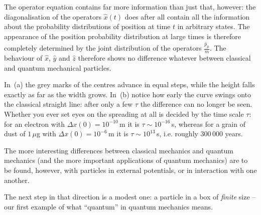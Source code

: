 The operator equation contains far more information than just that, however: the diagonalisation of the operators $\widehat{x}(t)$ does after all contain all the information about the probability distributions of position at time $t$ in arbitrary states. The appearance of the position probability distribution at large times is therefore completely determined by the joint distribution of the operators $\frac{\widehat{p}_\mu}{m}$. The behaviour of $\widehat{x}$, $\widehat{y}$ and $\widehat{z}$ therefore shows no difference whatever between classical and quantum mechanical particles.



In~(a) the grey marks of the centres advance in equal steps, while
the height falls exactly as far as the width grows. In~(b) notice
how early the curve swings onto the classical straight line: after only a few
$\tau$ the difference can no longer be seen. Whether you ever set eyes
on the spreading at all is decided by the time scale $\tau$: for an electron with
$\Delta x(0) = 10^{-10}$\,m it is $\tau \sim 10^{-16}$\,s, whereas for a grain of dust of
$1\,\mu$g with $\Delta x(0) = 10^{-6}$\,m it is $\tau \sim 10^{13}$\,s, i.e.
roughly $300\,000$ years.

The more interesting differences between classical mechanics and quantum mechanics (and the more important applications of quantum mechanics) are to be found, however, with particles in external potentials, or in interaction with one another.

The next step in that direction is a modest one: a particle in a box of \emph{finite} size -- our first example of what ``quantum'' in quantum mechanics means.
